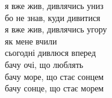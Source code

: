 я вже жив, дивлячись униз\\
бо не знав, куди дивитися\\

я вже жив, дивлячись угору\\
як мене вчили\\

сьогодні дивлюся вперед\\
бачу очі, що люблять\\
бачу море, що стає сонцем\\
бачу сонце, що стає морем\\
